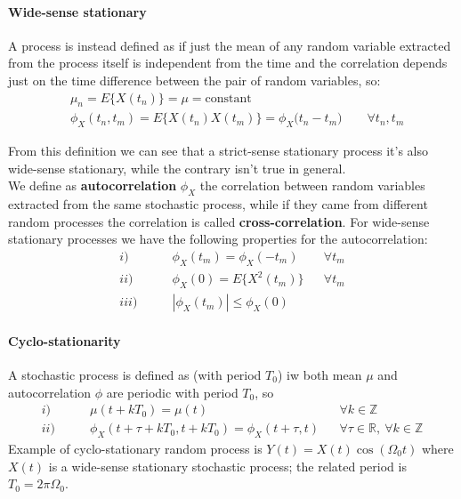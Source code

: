 		\paragraph{Wide-sense stationary} A process is instead defined as  if just the mean of any random variable extracted from the process itself is independent from the time and the correlation depends just on the  time difference between the pair of random variables, so:
		\begin{align*}
			& \mu_n = E\{ X(t_n) \} = \mu = \textrm{constant} \\
			& \phi_X (t_n,t_m) = E\{ X(t_n) X(t_m) \} = \phi_X \big(t_n-t_m\big) \qquad \forall t_n,t_m
		\end{align*}
		
		From this definition we can see that a strict-sense stationary process it's also wide-sense stationary, while the contrary isn't true in general. \\
		We define as \textbf{autocorrelation} $\phi_X$ the correlation between random variables extracted from the same stochastic process, while if they came from different random processes the correlation is called \textbf{cross-correlation}. For wide-sense stationary processes we have the following properties for the autocorrelation:
		\begin{align*}
			i) \qquad & \phi_X (t_m) = \phi_X (-t_m) && \forall t_m \\
			ii) \qquad & \phi_X(0) = E\{ X^2(t_m)\} && \forall t_m \\
			iii) \qquad & |\phi_X(t_m)| \leq \phi_X(0)
		\end{align*}
		
		\paragraph{Cyclo-stationarity} A stochastic process is defined as  (with period $T_0$) iw both mean $\mu$ and autocorrelation $\phi$ are periodic with period $T_0$, so
		\begin{align*}
			i) \qquad & \mu(t+ kT_0) = \mu(t) && \forall k\in\mathds Z \\
			ii) \qquad & \phi_X(t+\tau+kT_0, t+kT_0) = \phi_X(t+\tau,t) && \forall \tau \in \mathds R , \ \forall k\in \mathds Z
		\end{align*}
		Example of cyclo-stationary random process is $Y(t) = X(t) \cos(\Omega_0 t)$ where $X(t)$ is a wide-sense stationary stochastic process; the related period is $T_0 = 2\pi \Omega_0$.
		

